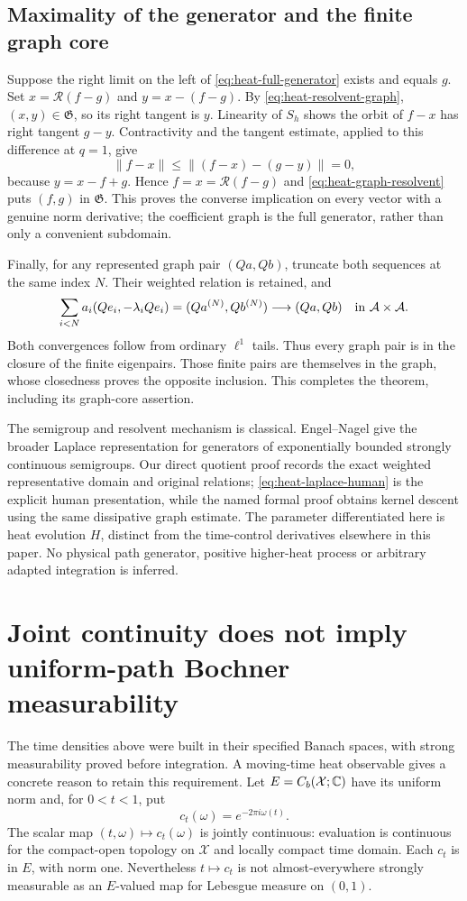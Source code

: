 \documentclass[11pt]{article}
\theoremstyle{remark}\newtheorem{remark}[theorem]{Remark}
\newcommand{\A}{\mathcal A}\newcommand{\X}{\mathcal X}
\begin{document}
\subsection{Maximality of the generator and the finite graph core}
Suppose the right limit on the left of
\eqref{eq:heat-full-generator} exists and equals $g$. Set
$x=\mathcal R(f-g)$ and $y=x-(f-g)$. By
\eqref{eq:heat-resolvent-graph}, $(x,y)\in\mathfrak G$, so its
right tangent is $y$. Linearity of $S_h$ shows the orbit of $f-x$
has right tangent $g-y$. Contractivity and the tangent estimate,
applied to this difference at $q=1$, give
\[
 \|f-x\|\leq\|(f-x)-(g-y)\|=0,
\]
because $y=x-f+g$. Hence $f=x=\mathcal R(f-g)$ and
\eqref{eq:heat-graph-resolvent} puts $(f,g)$ in $\mathfrak G$.
This proves the converse implication on every vector with a genuine
norm derivative; the coefficient graph is the full generator,
rather than only a convenient subdomain.

Finally, for any represented graph pair $(Qa,Qb)$, truncate both
sequences at the same index $N$. Their weighted relation is retained,
and
\[
 \sum_{i<N}a_i(Qe_i,-\lambda_iQe_i)
     =(Qa^{(N)},Qb^{(N)})\longrightarrow(Qa,Qb)
       \quad\hbox{in }\A\times\A.
\]
Both convergences follow from ordinary $\ell^1$ tails. Thus every
graph pair is in the closure of the finite eigenpairs. Those
finite pairs are themselves in the graph, whose closedness proves
the opposite inclusion. This completes the theorem, including
its graph-core assertion.

The semigroup and resolvent mechanism is classical. Engel--Nagel
\cite[Theorem II.1.10, equation (1.13)]{EN} give the broader
Laplace representation for generators of exponentially bounded
strongly continuous semigroups. Our direct quotient proof records
the exact weighted representative domain and original relations;
\eqref{eq:heat-laplace-human} is the explicit human presentation,
while the named formal proof obtains kernel descent using the same
dissipative graph estimate. The parameter differentiated here is
heat evolution $H$, distinct from the time-control derivatives
elsewhere in this paper. No physical path generator, positive
higher-heat process or arbitrary adapted integration is inferred.


\section{Joint continuity does not imply uniform-path Bochner measurability}
The time densities above were built in their specified Banach spaces,
with strong measurability proved before integration. A moving-time
heat observable gives a concrete reason to retain this requirement.
Let $E=C_b(\X;\C)$ have its uniform norm and, for $0<t<1$, put
\[
 c_t(\omega)=e^{-2\pi i\omega(t)}.
\]
The scalar map $(t,\omega)\mapsto c_t(\omega)$ is jointly continuous:
evaluation is continuous for the compact-open topology on $\X$ and
locally compact time domain. Each $c_t$ is in $E$, with norm one.
Nevertheless $t\mapsto c_t$ is not almost-everywhere strongly
measurable as an $E$-valued map for Lebesgue measure on $(0,1)$.
\end{document}
